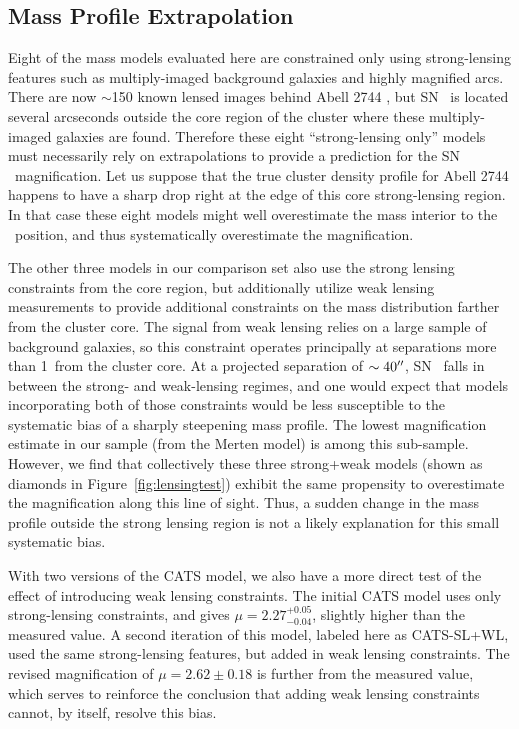 \subsection{Mass Profile Extrapolation}
\label{sec:MassProfileExtrapolation}

Eight of the mass models evaluated here are constrained only using
strong-lensing features such as multiply-imaged background galaxies
and highly magnified arcs.  There are now $\sim$150 known lensed
images behind Abell 2744 \citep{Jauzac:2014c}, but SN \tomas\ is
located several arcseconds outside the core region of the cluster
where these multiply-imaged galaxies are found.  Therefore these eight
``strong-lensing only'' models must necessarily rely on extrapolations
to provide a prediction for the SN \tomas\ magnification.  Let us
suppose that the true cluster density profile for Abell 2744 happens
to have a sharp drop right at the edge of this core strong-lensing
region. In that case these eight models might well overestimate the
mass interior to the \tomas\ position, and thus systematically
overestimate the magnification.

The other three models in our comparison set also use the strong
lensing constraints from the core region, but additionally utilize
weak lensing measurements to provide additional constraints on the
mass distribution farther from the cluster core.  The signal from weak
lensing relies on a large sample of background galaxies, so this
constraint operates principally at separations more than 1\arcmin\ from
the cluster core.  At a projected separation of $\sim40^{\prime\prime}$,
SN \tomas\ falls in between the strong- and weak-lensing regimes, and
one would expect that models incorporating both of those constraints
would be less susceptible to the systematic bias of a sharply
steepening mass profile.  The lowest magnification estimate in our
sample (from the Merten model) is among this sub-sample.  However, we
find that collectively these three strong+weak models (shown as
diamonds in Figure~\ref{fig:lensingtest}) exhibit the same propensity
to overestimate the magnification along this line of sight.  Thus, a
sudden change in the mass profile outside the strong lensing region is
not a likely explanation for this small systematic bias.

With two versions of the CATS model, we also have a more direct test
of the effect of introducing weak lensing constraints.  The initial
CATS model uses only strong-lensing constraints, and gives
$\mu=2.27^{+0.05}_{-0.04}$, slightly higher than the measured value.
A second iteration of this model, labeled here as CATS-SL+WL, used the
same strong-lensing features, but added in weak lensing constraints.
The revised magnification of $\mu=2.62\pm0.18$ is further from the
measured value, which serves to reinforce the conclusion that adding
weak lensing constraints cannot, by itself, resolve this bias.


